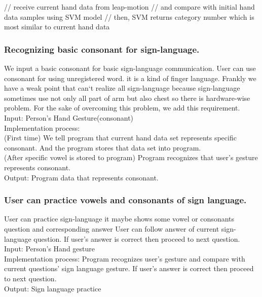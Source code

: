 \documentclass[10pt,journal,compsoc]{IEEEtran}
\begin{document}
// receive current hand data from leap-motion
// and compare with initial hand data samples using SVM model
// then, SVM returns category number which is most similar to current hand data


\subsubsection{ Recognizing basic consonant for sign-language.\\}

We input a basic consonant for basic sign-language communication. User can use consonant for using unregistered word. it is a kind of finger language. Frankly we have a weak point that can`t realize all sign-language because sign-language sometimes use not only all part of arm but also chest so there is hardware-wise problem. For the sake of overcoming this problem, we add this requirement.
\\Input: Person's Hand Gesture(consonant)
\\Implementation process:
\\(First time) We tell program that current hand data set represents specific consonant. And the program stores that data set into program.
\\(After specific vowel is stored to program) Program recognizes that user’s gesture represents consonant.
\\Output: Program data that represents consonant.

\subsubsection{User can practice vowels and consonants of sign language.\\}
User can practice sign-language it maybe shows some vowel or consonants question and corresponding answer User can follow answer of current sign-language question. If user’s answer is correct then proceed to next question.
\\Input: Person's Hand gesture
\\Implementation process: Program recognizes user’s gesture and compare with current questions’ sign language gesture. If user’s answer is correct then proceed to next question.
\\Output: Sign language practice
\end{document}
